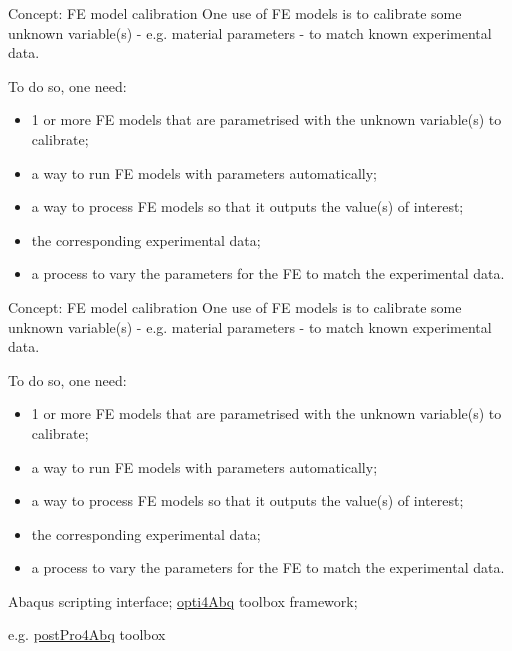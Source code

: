 \begin{frame}{Concept: FE model calibration}
One use of FE models is to calibrate some unknown variable(s) - e.g. material parameters - to match known experimental data.

To do so, one need: 
\begin{itemize}
\item 1 or more FE models that are parametrised with the unknown variable(s) to calibrate;
\item a way to run FE models with parameters automatically;
\item a way to process FE models so that it outputs the value(s) of interest;
\item the corresponding experimental data;
\item a process to vary the parameters for the FE to match the experimental data.
\end{itemize}

\end{frame}


\begin{frame}{Concept: FE model calibration}
One use of FE models is to calibrate some unknown variable(s) - e.g. material parameters - to match known experimental data.

To do so, one need: 
\begin{itemize}
\item {\color{blue} 1 or more FE models that are parametrised with the unknown variable(s) to calibrate};
\item {\color{darkgreen} a way to run FE models with parameters automatically};
\item {\color{orange} a way to process FE models so that it outputs the value(s) of interest};
\item the corresponding experimental data;
\item {\color{darkgreen} a process to vary the parameters for the FE to match the experimental data}.
\end{itemize}

{\color{blue} Abaqus scripting interface}; {\color{darkgreen} \href{https://github.com/mengomarlene/opti4Abq}{opti4Abq} toolbox framework};

{\color{orange} e.g. \href{https://github.com/mengomarlene/postPro4Abq}{postPro4Abq} toolbox}
\end{frame}